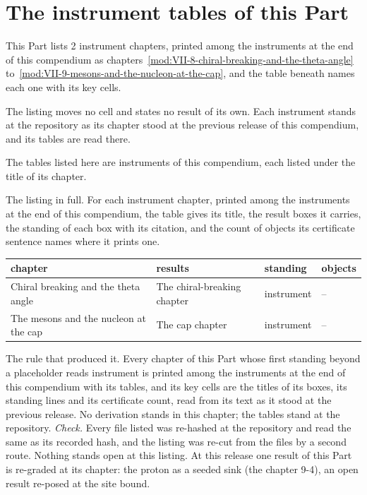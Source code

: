 \section{The instrument tables of this Part}\label{mod:IX-L-the-instrument-tables-at-the-repository}
\begin{chtable}\label{box:IX-L-the-instrument-tables-at-the-repository:1}
This Part lists 2 instrument chapters, printed among the instruments at the end of this compendium as chapters~\ref{mod:VII-8-chiral-breaking-and-the-theta-angle} to~\ref{mod:VII-9-mesons-and-the-nucleon-at-the-cap}, and the table beneath names each one with its key cells.
\end{chtable}
The listing moves no cell and states no result of its own. Each instrument stands at the repository as its chapter stood at the previous release of this compendium, and its tables are read there.
\begin{chbridge}
The tables listed here are instruments of this compendium, each listed under the title of its chapter.
\end{chbridge}
\begin{chproof}[instrument]
The listing in full. For each instrument chapter, printed among the instruments at the end of this compendium, the table gives its title, the result boxes it carries, the standing of each box with its citation, and the count of objects its certificate sentence names where it prints one.
{\small
\begin{longtable}{p{38mm}p{63mm}p{30mm}p{14mm}}
\hline
chapter & results & standing & objects \\
\hline
\endhead
Chiral breaking and the theta angle & The chiral-breaking chapter & instrument & -- \\
The mesons and the nucleon at the cap & The cap chapter & instrument & -- \\
\hline
\end{longtable}
}
The rule that produced it. Every chapter of this Part whose first standing beyond a placeholder reads instrument is printed among the instruments at the end of this compendium with its tables, and its key cells are the titles of its boxes, its standing lines and its certificate count, read from its text as it stood at the previous release.
No derivation stands in this chapter; the tables stand at the repository.
\emph{Check.} Every file listed was re-hashed at the repository and read the same as its recorded hash, and the listing was re-cut from the files by a second route.
Nothing stands open at this listing. At this release one result of this Part is re-graded at its chapter: the proton as a seeded sink (the chapter 9-4), an open result re-posed at the site bound.
\end{chproof}
\label{chend:IX-L-the-instrument-tables-at-the-repository}

